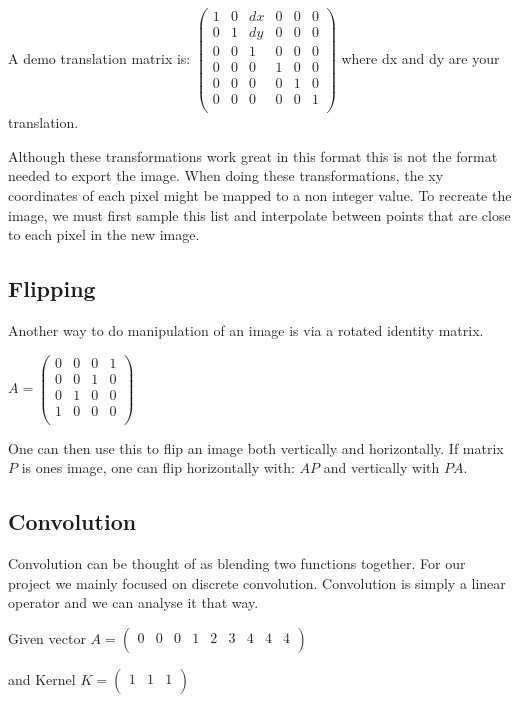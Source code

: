 \documentclass[11pt]{article}
\begin{document}
A demo translation matrix is:
  $\begin{pmatrix}
	1 & 0 & dx & 0 & 0 & 0\\
	0 & 1 & dy & 0 & 0 & 0\\
	0 & 0 & 1 & 0 & 0 & 0\\
	0 & 0 & 0 & 1 & 0 & 0\\
	0 & 0 & 0 & 0 & 1 & 0\\
	0 & 0 & 0 & 0 & 0 & 1\\
\end{pmatrix}$
where dx and dy are your translation.

Although these transformations work great in this format this is not the format needed to export the image. When doing these transformations, the xy coordinates of each pixel might be mapped to a non integer value. To recreate the image, we must first sample this list and interpolate between points that are close to each pixel in the new image.


\subsection{Flipping}
Another way to do manipulation of an image is via a rotated identity matrix. 

$A = \begin{pmatrix}
	0 & 0 & 0 & 1\\
	0 & 0 & 1 & 0\\
	0 & 1 & 0 & 0\\
	1 & 0 & 0 & 0\\
\end{pmatrix}$

One can then use this to flip an image both vertically and horizontally.
If matrix $P$ is ones image, one can flip horizontally with:
$A P$ and vertically with $P A$. 

\subsection{Convolution}
Convolution can be thought of as blending two functions together. For our project we mainly focused on discrete convolution. Convolution is simply a linear operator and we can analyse it that way. 

Given vector
$ A = \begin{pmatrix}
	0 & 0 & 0 & 1 & 2 & 3 & 4 & 4 & 4\\
\end{pmatrix}$

and Kernel $K = \begin{pmatrix}
	1 & 1 & 1 \\
\end{pmatrix}$
\end{document}
